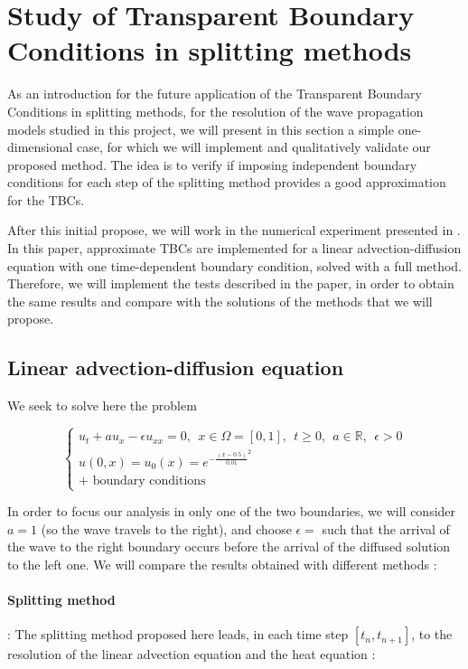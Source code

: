 \section{Study of Transparent Boundary Conditions in splitting methods}

\indent As an introduction for the future application of the Transparent Boundary Conditions in splitting methods, for the resolution of the wave propagation models studied in this project, we will present in this section a simple one-dimensional case, for which we will implement and qualitatively validate our proposed method. The idea is to verify if imposing independent boundary conditions for each step of the splitting method provides a good approximation for the TBCs.

\indent After this initial propose, we will work in the numerical experiment presented in \cite{halpern1986}. In this paper, approximate TBCs are implemented for a linear advection-diffusion equation with one time-dependent boundary condition, solved with a full method. Therefore, we will implement the tests described in the paper, in order to obtain the same results and compare with the solutions of the methods that we will propose.  

\subsection{Linear advection-diffusion equation}

\indent We seek to solve here the problem

\begin{equation}
	\label{eq:LinearAdvDiffEq}
	\begin{cases}
	u_t + au_x - \epsilon u_{xx} = 0, \ \ x \in \Omega = [0,1], \ \ t \ge 0  , \ \ a \in \mathbb{R}, \ \ \epsilon > 0 \\
	u(0,x) = u_0(x) = e^{-{\frac{(x-0.5)}{0.01}}^2} \\
	\text{+ boundary conditions} 		
	\end{cases} 
\end{equation}

\indent In order to focus our analysis in only one of the two boundaries, we will consider $a = 1$ (so the wave travels to the right), and choose $\epsilon = $ such that the arrival of the wave to the right boundary occurs before the arrival of the diffused solution to the left one. We will compare the results obtained with different methods :

\paragraph{Splitting method} :  The splitting method proposed here leads, in each time step $[t_n,t_{n+1}]$, to the resolution of the linear advection equation and the heat equation :

